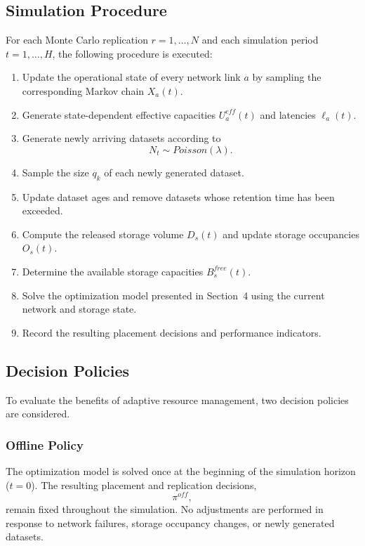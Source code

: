 \documentclass[a4paper,fleqn]{cas-dc}
\begin{document}
\subsection*{Simulation Procedure}

For each Monte Carlo replication \(r=1,\ldots,N\) and each simulation period \(t=1,\ldots,H\), the following procedure is executed: 

\begin{enumerate} 
\item Update the operational state of every network link \(a\) by sampling the corresponding Markov chain \(X_a(t)\). 
\item Generate state-dependent effective capacities \(U_a^{eff}(t)\) and latencies \(\ell_a(t)\). 
\item Generate newly arriving datasets according to \[ N_t \sim Poisson(\lambda). \] 
\item Sample the size \(q_k\) of each newly generated dataset. 
\item Update dataset ages and remove datasets whose retention time has been exceeded. 
\item Compute the released storage volume \(D_s(t)\) and update storage occupancies \(O_s(t)\). 
\item Determine the available storage capacities \(B_s^{free}(t)\). 
\item Solve the optimization model presented in Section~4 using the current network and storage state. 
\item Record the resulting placement decisions and performance indicators. 
\end{enumerate}

\subsection*{Decision Policies} 

To evaluate the benefits of adaptive resource management, two decision policies are considered. 

\subsubsection*{Offline Policy} 

The optimization model is solved once at the beginning of the simulation horizon (\(t=0\)). The resulting placement and replication decisions, \begin{equation} \nonumber \pi^{off}, \end{equation} remain fixed throughout the simulation. No adjustments are performed in response to network failures, storage occupancy changes, or newly generated datasets. 
\end{document}
